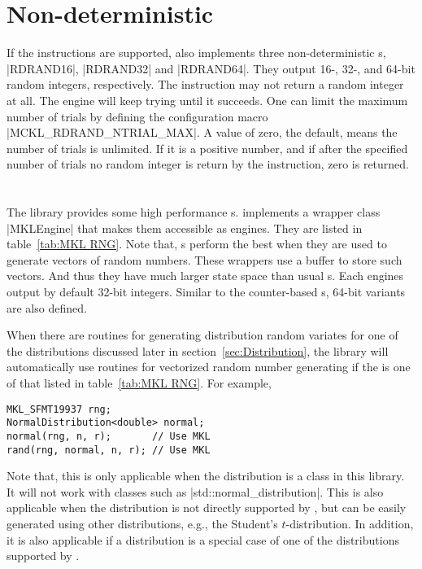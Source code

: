 \section{Non-deterministic \texorpdfstring{\protect\rng}{RNG}}
\label{sec:Non-deterministic RNG}

If the \rdrand instructions are supported, \mckl also implements three
non-deterministic \rng{}s, |RDRAND16|, |RDRAND32| and |RDRAND64|. They output
16-, 32-, and 64-bit random integers, respectively. The \rdrand instruction may
not return a random integer at all. The \rng engine will keep trying until it
succeeds. One can limit the maximum number of trials by defining the
configuration macro |MCKL_RDRAND_NTRIAL_MAX|. A value of zero, the default,
means the number of trials is unlimited. If it is a positive number, and if
after the specified number of trials no random integer is return by the \rdrand
instruction, zero is returned.

\section{\texorpdfstring{\protect\rng{} \protect\rng}{MKL RNG}}
\label{sec:MKL RNG}

The \mkl library provides some high performance \rng{}s. \mckl implements a
wrapper class |MKLEngine| that makes them accessible as \cpp engines. They are
listed in table~\ref{tab:MKL RNG}. Note that, \mkl{} \rng{}s perform the best
when they are used to generate vectors of random numbers. These wrappers use a
buffer to store such vectors. And thus they have much larger state space than
usual \rng{}s. Each \rng engines output by default 32-bit integers. Similar to
the counter-based \rng{}s, 64-bit variants are also defined.

When there are \mkl routines for generating distribution random variates for
one of the distributions discussed later in section~\ref{sec:Distribution}, the
library will automatically use \mkl routines for vectorized random number
generating if the \rng{} is one of that listed in table~\ref{tab:MKL RNG}. For
example,
\begin{Verbatim}
MKL_SFMT19937 rng;
NormalDistribution<double> normal;
normal(rng, n, r);       // Use MKL
rand(rng, normal, n, r); // Use MKL
\end{Verbatim}
Note that, this is only applicable when the distribution is a class in this
library. It will not work with classes such as |std::normal_distribution|. This
is also applicable when the distribution is not directly supported by \mkl, but
can be easily generated using other distributions, e.g., the Student's
$t$-distribution. In addition, it is also applicable if a distribution is a
special case of one of the distributions supported by \mkl.

